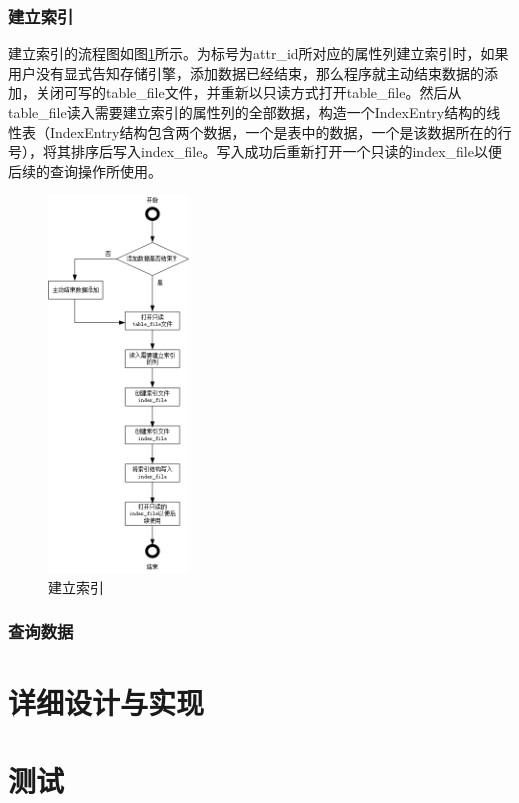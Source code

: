 \documentclass[bachelor]{thesis-uestc}
\begin{document}
\subsection{建立索引}
建立索引的流程图如图\ref{fig:build_index}所示。为标号为attr\_id所对应的属性列建立索引时，如果用户没有显式告知存储引擎，添加数据已经结束，那么程序就主动结束数据的添加，关闭可写的table\_file文件，并重新以只读方式打开table\_file。然后从table\_file读入需要建立索引的属性列的全部数据，构造一个IndexEntry结构的线性表（IndexEntry结构包含两个数据，一个是表中的数据，一个是该数据所在的行号），将其排序后写入index\_file。写入成功后重新打开一个只读的index\_file以便后续的查询操作所使用。

\begin{figure}[htbp]
	\centering\includegraphics[height=10cm]{images/build_index.png}
	\caption{建立索引}
	\label{fig:build_index}
\end{figure}

\subsection{查询数据}

\chapter{详细设计与实现}

\chapter{测试}
\end{document}
